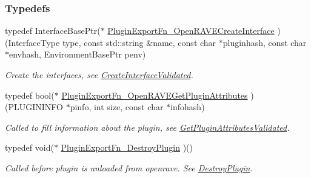 \subsubsection*{Typedefs}
\begin{DoxyCompactItemize}
\item 
\hypertarget{group__plugin__exports_ga6ae2f1554f547f27e4a5399d8aef7377}{
typedef InterfaceBasePtr($\ast$ \hyperlink{group__plugin__exports_ga6ae2f1554f547f27e4a5399d8aef7377}{PluginExportFn\_\-OpenRAVECreateInterface} )(InterfaceType type, const std::string \&name, const char $\ast$pluginhash, const char $\ast$envhash, EnvironmentBasePtr penv)}
\label{group__plugin__exports_ga6ae2f1554f547f27e4a5399d8aef7377}

\begin{DoxyCompactList}\small\item\em Create the interfaces, see \hyperlink{group__plugin__exports_ga468c900067e08689383b3f8da642141f}{CreateInterfaceValidated}. \item\end{DoxyCompactList}\item 
\hypertarget{group__plugin__exports_ga7cb4e2769bee1dca182b4432a900bc70}{
typedef bool($\ast$ \hyperlink{group__plugin__exports_ga7cb4e2769bee1dca182b4432a900bc70}{PluginExportFn\_\-OpenRAVEGetPluginAttributes} )(PLUGININFO $\ast$pinfo, int size, const char $\ast$infohash)}
\label{group__plugin__exports_ga7cb4e2769bee1dca182b4432a900bc70}

\begin{DoxyCompactList}\small\item\em Called to fill information about the plugin, see \hyperlink{group__plugin__exports_gaf90c03438b94cc76e7b8a54d445ec106}{GetPluginAttributesValidated}. \item\end{DoxyCompactList}\item 
\hypertarget{group__plugin__exports_ga7164d2e9a268c6e44a296e9488df69cd}{
typedef void($\ast$ \hyperlink{group__plugin__exports_ga7164d2e9a268c6e44a296e9488df69cd}{PluginExportFn\_\-DestroyPlugin} )()}
\label{group__plugin__exports_ga7164d2e9a268c6e44a296e9488df69cd}

\begin{DoxyCompactList}\small\item\em Called before plugin is unloaded from openrave. See \hyperlink{group__plugin__exports_gad6773d91dae37d0ba9de59d2a05277e4}{DestroyPlugin}. \item\end{DoxyCompactList}\end{DoxyCompactItemize}
